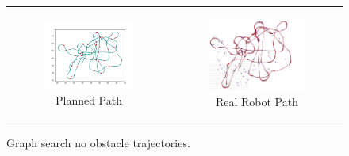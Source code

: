 \begin{figure}[H]
    \centering
    \begin{tabular}{cc} 
        \begin{subfigure}{0.4\textwidth}
            \centering
            \includegraphics[width=\textwidth]{Images/real_robot/minh_planned.png}
            \caption{Planned Path}
        \end{subfigure} 
        &
        \begin{subfigure}{0.4\textwidth}
            \centering
            \includegraphics[width=\textwidth]{Images/real_robot/minh_simu.png}
            \caption{Real Robot Path}
        \end{subfigure}
    \end{tabular}
    \caption{Graph search no obstacle trajectories.\label{fig:gr_obs_traj}} 
\end{figure}


